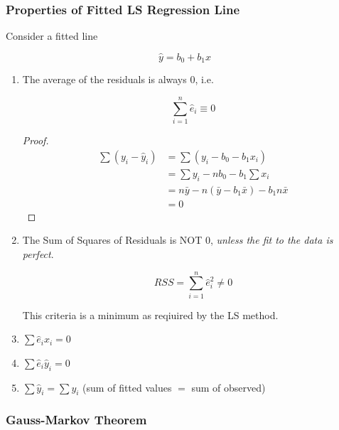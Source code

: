 \documentclass[11pt]{article}
\theoremstyle{definition}
\numberwithin{equation}{section}
\begin{document}
\subsubsection{Properties of Fitted LS Regression Line}

Consider a fitted line

\begin{equation*}
  \hat{y} = b_0 + b_1 x
\end{equation*}

\begin{enumerate}

\item The average of the residuals is always 0, i.e.

\begin{equation}\label{sum-residuals-zero}
  \sum^n_{i=1}\hat{e}_i \equiv 0
\end{equation}

\begin{proof}
\begin{align*}
  \sum (y_i - \hat{y}_i) &= \sum(y_i - b_0 - b_1x_i)\\
  &= \sum y_i - nb_0 - b_1\sum x_i\\
  &= n\bar{y} - n(\bar{y} - b_1\bar{x}) - b_1n\bar{x}\\
  &= 0
\end{align*}
\end{proof}

\item The Sum of Squares of Residuals is NOT $0$, \textit{unless the fit to the data is perfect}.

\begin{equation}\label{RSS-not-zero}
  RSS = \sum^n_{i=1}\hat{e}_i^2 \neq 0
\end{equation}

This criteria is a minimum as reqiuired by the LS method.

\item $\sum \hat{e}_ix_i = 0$
\item $\sum \hat{e}_i\hat{y}_i=0$
\item $\sum \hat{y}_i = \sum y_i$ (sum of fitted values $=$ sum of observed)
\end{enumerate}

\subsubsection{Gauss-Markov Theorem}
\end{document}
